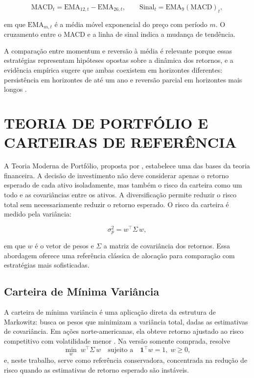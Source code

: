 \begin{equation}
\mathrm{MACD}_t = \mathrm{EMA}_{12,t} - \mathrm{EMA}_{26,t}, \qquad \mathrm{Sinal}_t = \mathrm{EMA}_{9}(\mathrm{MACD})_t,
\end{equation}

\noindent em que $\mathrm{EMA}_{m,t}$ é a média móvel exponencial do preço com período $m$. O cruzamento entre o MACD e a linha de sinal indica a mudança de tendência.

A comparação entre momentum e reversão à média é relevante porque essas estratégias representam hipóteses opostas sobre a dinâmica dos retornos, e a evidência empírica sugere que ambas coexistem em horizontes diferentes: persistência em horizontes de até um ano e reversão parcial em horizontes mais longos \citep{JegadeeshTitman1993, PoterbaSummers1988, Moskowitz2012}.

\section{TEORIA DE PORTFÓLIO E CARTEIRAS DE REFERÊNCIA}

A Teoria Moderna de Portfólio, proposta por \citet{Markowitz1952}, estabelece uma das bases da teoria financeira. A decisão de investimento não deve considerar apenas o retorno esperado de cada ativo isoladamente, mas também o risco da carteira como um todo e as covariâncias entre os ativos. A diversificação permite reduzir o risco total sem necessariamente reduzir o retorno esperado. O risco da carteira é medido pela variância:

\begin{equation}
\sigma_p^2 = w^{\top} \Sigma\, w,
\end{equation}

\noindent em que $w$ é o vetor de pesos e $\Sigma$ a matriz de covariância dos retornos. Essa abordagem oferece uma referência clássica de alocação para comparação com estratégias mais sofisticadas.

\subsection{Carteira de Mínima Variância}

A carteira de mínima variância é uma aplicação direta da estrutura de Markowitz: busca os pesos que minimizam a variância total, dadas as estimativas de covariância. Em ações norte-americanas, ela obteve retorno ajustado ao risco competitivo com volatilidade menor \citep{Clarke2006}. Na versão somente comprada, resolve
\begin{equation}
\min_{w}\; w^{\top} \Sigma\, w \quad \text{sujeito a} \quad \mathbf{1}^{\top} w = 1, \; w \geq 0,
\end{equation}
\noindent e, neste trabalho, serve como referência conservadora, concentrada na redução de risco quando as estimativas de retorno esperado são instáveis.

